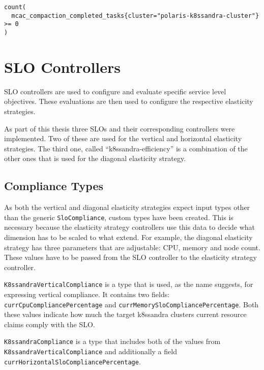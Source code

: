 \begin{lstlisting}[caption={PromQL query used to get the amount of nodes in the k8ssandra cluster},
                    captionpos=b,
                    label=lst:getNodeCount,
                    float]
count(
  mcac_compaction_completed_tasks{cluster="polaris-k8ssandra-cluster"} >= 0
)
\end{lstlisting}

\section{SLO Controllers}
\label{sec:slos}

SLO controllers are used to configure and evaluate specific service level objectives. These evaluations are then used to configure the respective elasticity strategies.

As part of this thesis three SLOs and their corresponding controllers were implemented. Two of these are used for the vertical and horizontal elasticity strategies. The third one, called ``k8ssandra-efficiency'' is a combination of the other ones that is used for the diagonal elasticity strategy.

\subsection{Compliance Types}
\label{sec:compliance-types}

As both the vertical and diagonal elasticity strategies expect input types other than the generic \texttt{SloCompliance}, custom types have been created. This is necessary because the elasticity strategy controllers use this data to decide what dimension has to be scaled to what extend. For example, the diagonal elasticity strategy has three parameters that are adjustable: CPU, memory and node count. These values have to be passed from the SLO controller to the elasticity strategy controller.

\texttt{K8ssandraVerticalCompliance} is a type that is used, as the name suggests, for expressing vertical compliance. It contains two fields: \texttt{currCpuCompliancePercentage} and \texttt{currMemorySloCompliancePercentage}. Both these values indicate how much the target k8ssandra clusters current resource claims comply with the SLO.

\texttt{K8ssandraCompliance} is a type that includes both of the values from \texttt{K8ssandra\-Vertical\-Compliance} and additionally a field \texttt{curr\-Horizontal\-Slo\-Compliance\-Percentage}.

